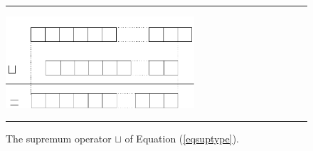 \begin{figure}[tb]
  \begin{center}
\hrule
\vspace{0.1cm}
    \includegraphics[width=7cm]{cuptype.pdf}
\vspace{0.2cm}
\hrule
    \caption{    \label{figsuptype}The supremum operator $\sqcup$ of  Equation (\ref{eqsuptype}).}
  \end{center}
\end{figure}


